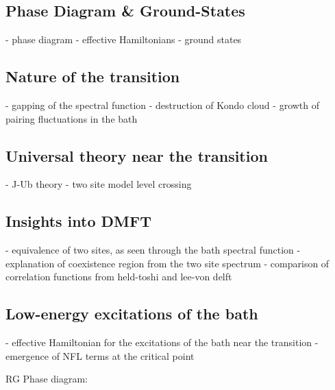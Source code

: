\documentclass[8pt,aspectratio=169]{beamer}
\begin{document}
\begin{frame}{}
\section{Phase Diagram \& Ground-States}
- phase diagram
- effective Hamiltonians
- ground states
\end{frame}

\begin{frame}{}
\section{Nature of the transition}
- gapping of the spectral function
- destruction of Kondo cloud
- growth of pairing fluctuations in the bath
\end{frame}

\begin{frame}{}
\section{Universal theory near the transition}
- J-Ub theory
- two site model level crossing
\end{frame}

\begin{frame}{}
\section{Insights into DMFT}
- equivalence of two sites, as seen through the bath spectral function
- explanation of coexistence region from the two site spectrum
- comparison of correlation functions from held-toshi and lee-von delft
\end{frame}

\begin{frame}{}
\section{Low-energy excitations of the bath}
- effective Hamiltonian for the excitations of the bath near the transition
- emergence of NFL terms at the critical point
\end{frame}

\begin{frame}{RG Phase diagram: }
\end{frame}
\end{document}
